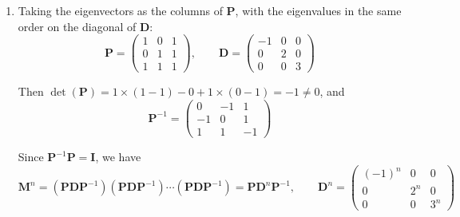 \documentclass[leqno]{article}
\begin{document}
\begin{enumerate}[
  label=\textbf{\arabic*.},
  leftmargin=*,
  topsep=0pt,
  partopsep=0pt,
  parsep=0pt
]
\begin{djsSolution}
\begin{enumerate}[label=\textbf{(\alph*)}, start=1]
\(\lambda=3\):
\[
\begin{pmatrix} 0 & 4 & -4 \\ 1 & 0 & -1 \\ 1 & 4 & -5 \end{pmatrix}\begin{pmatrix}x\\y\\z\end{pmatrix}=\mathbf{0}
\quad\Longrightarrow\quad 4y-4z=0,\qquad x-z=0,\qquad x+4y-5z=0
\]

So \(y=z\) and \(x=z\), which also satisfy the third equation. An eigenvector is \(\begin{pmatrix}1\\1\\1\end{pmatrix}\).

Any non-zero multiple of each of these vectors is also an eigenvector.

  \item Taking the eigenvectors as the columns of \(\mathbf{P}\), with the eigenvalues in the same order on the diagonal of \(\mathbf{D}\):
\[
\mathbf{P}=\begin{pmatrix} 1 & 0 & 1 \\ 0 & 1 & 1 \\ 1 & 1 & 1 \end{pmatrix},\qquad
\mathbf{D}=\begin{pmatrix} -1 & 0 & 0 \\ 0 & 2 & 0 \\ 0 & 0 & 3 \end{pmatrix}
\]

Then \(\det(\mathbf{P})=1\times(1-1)-0+1\times(0-1)=-1\neq 0\), and
\[
\mathbf{P}^{-1}=\begin{pmatrix} 0 & -1 & 1 \\ -1 & 0 & 1 \\ 1 & 1 & -1 \end{pmatrix}
\]

Since \(\mathbf{P}^{-1}\mathbf{P}=\mathbf{I}\), we have
\[
\mathbf{M}^n=(\mathbf{P}\mathbf{D}\mathbf{P}^{-1})(\mathbf{P}\mathbf{D}\mathbf{P}^{-1})\cdots(\mathbf{P}\mathbf{D}\mathbf{P}^{-1})=\mathbf{P}\mathbf{D}^n\mathbf{P}^{-1},\qquad
\mathbf{D}^n=\begin{pmatrix} (-1)^n & 0 & 0 \\ 0 & 2^n & 0 \\ 0 & 0 & 3^n \end{pmatrix}
\]


\end{enumerate}
\end{djsSolution}
\end{enumerate}
\end{document}
